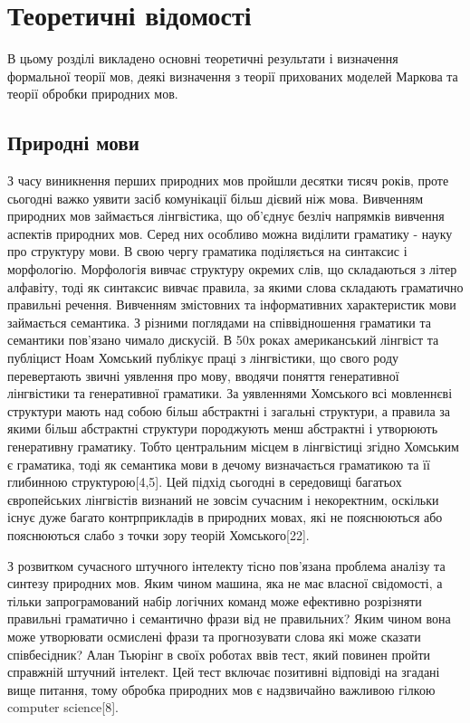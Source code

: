 
\chapter{Теоретичні відомості}
\label{chap:review}
В цьому розділі викладено основні теоретичні результати і визначення формальної теорії мов, деякі визначення з теорії прихованих моделей Маркова та теорії обробки природних мов.

\section{Природні мови}

З часу виникнення перших природних мов пройшли десятки тисяч років, проте сьогодні важко уявити засіб комунікації більш дієвий ніж мова.
Вивченням природних мов займається лінгвістика, що об'єднує безліч напрямків вивчення аспектів природних мов. Серед них особливо можна
виділити граматику - науку про структуру мови. В свою чергу граматика поділяється на синтаксис і морфологію. Морфологія вивчає структуру
окремих слів, що складаються з літер алфавіту, тоді як синтаксис вивчає правила, за якими слова складають граматично правильні речення.
Вивченням змістовних та інформативних характеристик мови займається семантика. З різними поглядами на співвідношення граматики
та семантики пов'язано чимало дискусій. В 50х роках американський лінгвіст та публіцист Ноам Хомський публікує праці з лінгвістики,
що свого роду перевертають звичні уявлення про мову, вводячи поняття генеративної лінгвістики та генеративної граматики. За уявленнями
Хомського всі мовленнєві структури мають над собою більш абстрактні і загальні структури, а правила за якими більш абстрактні структури
породжують менш абстрактні і утворюють генеративну граматику. Тобто центральним місцем в лінгвістиці згідно Хомським є граматика, тоді
як семантика мови в дечому визначається граматикою та її глибинною структурою[4,5]. Цей підхід сьогодні в середовищі багатьох європейських лінгвістів визнаний не зовсім сучасним і некоректним, оскільки існує дуже багато контрприкладів в природних мовах, які не пояснюються або пояснюються слабо з точки зору теорій Хомського[22].

З розвитком сучасного штучного інтелекту тісно пов'язана проблема аналізу та синтезу природних мов. Яким чином машина, яка не має власної
свідомості, а тільки запрограмований набір логічних команд може ефективно розрізняти правильні граматично і семантично фрази від
не правильних? Яким чином вона може утворювати осмислені фрази та прогнозувати слова які може сказати співбесідник? Алан Тьюрінг в своїх
роботах ввів тест, який повинен пройти справжній штучний інтелект. Цей тест включає позитивні відповіді на згадані вище питання,
тому обробка природних мов є надзвичайно важливою гілкою computer science[8].


